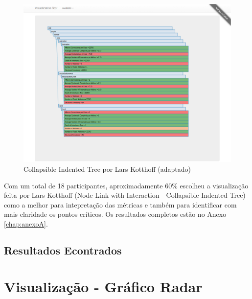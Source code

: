 \begin{figure}[!htb]
	\centering
    \includegraphics[keepaspectratio=true,scale=0.35]
    {figuras/node_link_tree_with_interaction.eps}
  \caption{Collapsible Indented Tree por Lars Kotthoff (adaptado)}
  \label{fig:node_link_tree_with_interaction}
\end{figure}

\newpage

\newpage

Com um total de 18 participantes, aproximadamente 60\% escolheu a visualização feita por Lars Kotthoff (Node Link with Interaction - Collapsible Indented Tree) como a melhor para intepretação das métricas e também para identificar com mais claridade os pontos críticos. Os resultados completos estão no Anexo \ref{chap:anexoA}.

\subsection{Resultados Econtrados}

\section{Visualização - Gráfico Radar}
